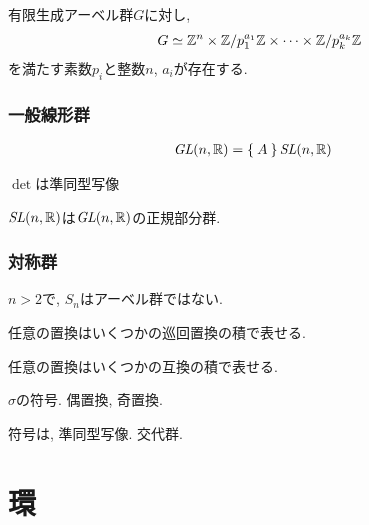   
  \begin{theorem}
    [有限生成アーベル群の基本定理]
    有限生成アーベル群$G$に対し,
    \begin{align*}
      G\simeq \mathbb{Z}^n \times \mathbb{Z}/p_1^{a_1} \mathbb{Z} \times \cdots \times \mathbb{Z}/p_k^{a_k}\mathbb{Z}
    \end{align*}
    を満たす素数$p_i$と整数$n$, $a_i$が存在する.
  \end{theorem}


  \subsection{一般線形群}
  \begin{align*}
    \textit{GL}(n,\mathbb{R})&=\Set{A}
    \textit{SL}(n,\mathbb{R})&
  \end{align*}
  \begin{prop}
    $\det$は準同型写像
  \end{prop}
  \begin{prop}
    $\textit{SL}(n,\mathbb{R})$は$\textit{GL}(n,\mathbb{R})$の正規部分群.
  \end{prop}

  \subsection{対称群}
  $n>2$で,
  $S_n$はアーベル群ではない.

  \begin{theorem}
    任意の置換はいくつかの巡回置換の積で表せる.
  \end{theorem}
  \begin{theorem}
    任意の置換はいくつかの互換の積で表せる.
  \end{theorem}

  \begin{definition}
    $\sigma$の符号.  偶置換, 奇置換.
  \end{definition}

  符号は, 準同型写像.  交代群.

  \chapter{環}
